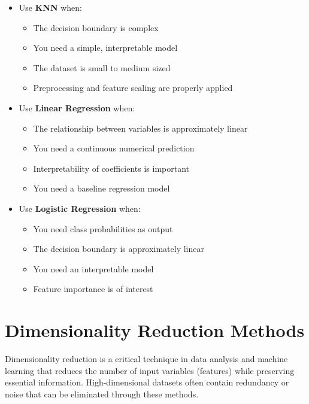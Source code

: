 \documentclass[
  letterpaper,
  DIV=11,
  numbers=noendperiod]{scrreprt}
\providecommand{\tightlist}{%
  \setlength{\itemsep}{0pt}\setlength{\parskip}{0pt}}\usepackage{longtable,booktabs,array}
\begin{document}
\begin{itemize}
\tightlist
\item
  Use \textbf{KNN} when:

  \begin{itemize}
  \tightlist
  \item
    The decision boundary is complex
  \item
    You need a simple, interpretable model
  \item
    The dataset is small to medium sized
  \item
    Preprocessing and feature scaling are properly applied
  \end{itemize}
\item
  Use \textbf{Linear Regression} when:

  \begin{itemize}
  \tightlist
  \item
    The relationship between variables is approximately linear
  \item
    You need a continuous numerical prediction
  \item
    Interpretability of coefficients is important
  \item
    You need a baseline regression model
  \end{itemize}
\item
  Use \textbf{Logistic Regression} when:

  \begin{itemize}
  \tightlist
  \item
    You need class probabilities as output
  \item
    The decision boundary is approximately linear
  \item
    You need an interpretable model
  \item
    Feature importance is of interest
  \end{itemize}
\end{itemize}


\chapter{Dimensionality Reduction
Methods}\label{dimensionality-reduction-methods}

Dimensionality reduction is a critical technique in data analysis and
machine learning that reduces the number of input variables (features)
while preserving essential information. High-dimensional datasets often
contain redundancy or noise that can be eliminated through these
methods.
\end{document}
